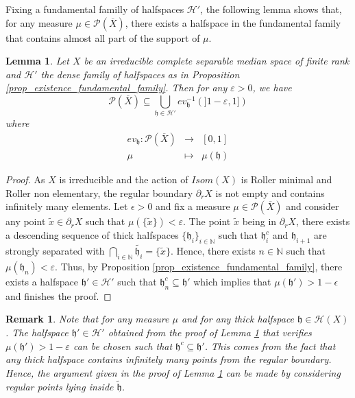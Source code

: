 \documentclass{amsart}
\numberwithin{equation}{section}
\newtheorem{lem}[thm]{Lemma}
\newtheorem{rmk}[thm]{Remark}
\newcommand{\HH}{\mathcal{H}}     %
\newcommand{\hh}{\mathfrak{h}}    %
\newcommand{\PP}{\mathcal{P}}     %
\newcommand{\NN}{\mathbb{N}}      %
\theoremstyle{definition}
\def\bar{\overline}
\begin{document}
Fixing a fundamental familly of halfspaces $\HH'$, the following lemma shows that, for any measure $\mu\in \PP(\bar X)$, there exists a halfspace in the fundamental family that contains almost all part of the support of $\mu$.
\begin{lem}\label{lem_measures_having_consistant_support_in_halfspace}
    Let $X$ be an irreducible complete separable median space of finite rank and $\HH'$ the dense family of halfspaces as in Proposition \ref{prop_existence_fundamental_family}. Then for any $\varepsilon>0$, we have 
    \[
    \PP(\bar{X})\subseteq \bigcup_{\hh\in\HH'}ev_\hh^{-1}(]1-\varepsilon,1])
    \]
    where 
    \begin{eqnarray*} 
    ev_\hh:\PP(\bar{X})&\rightarrow & [0,1] \\
           \mu &\mapsto& \mu(\hh)
       \end{eqnarray*}
\end{lem}
\begin{proof}
    As $X$ is irreducible and the action of $Isom(X)$ is Roller minimal and Roller non elementary, the regular boundary $\partial_r X$ is not empty and contains infinitely many elements. Let $\epsilon > 0$ and fix a measure $\mu\in\PP(\bar{X})$ and consider any point $\tilde{x}\in\partial_r X$ such that $\mu(\{\tilde{x}\})<\varepsilon$. The point $\tilde{x}$ being in $\partial_r X$, there exists a descending sequence of thick halfspaces $\{\hh_i\}_{i\in\NN}$ such that $\hh_i^c$ and $\hh_{i+1}$ are strongly separated with $\displaystyle{\bigcap_{i\in\NN}\tilde{\hh_i}}=\{\tilde{x}\}$. Hence, there exists $n\in\NN$ such that $\mu(\hh_n)<\varepsilon$. 
    Thus, by Proposition \ref{prop_existence_fundamental_family}, there exists a halfspace $\hh'\in \HH'$ such that $\hh_n^c\subseteq\hh'$ which implies that $\mu(\hh')>1-\epsilon$ and finishes the proof. 
\end{proof}

\begin{rmk}\label{rmk_measures_having_consistant_support_in_halfspace}
    Note that for any measure $\mu$ and for any thick halfspace $\hh\in\HH(X)$. The halfspace $\hh'\in\HH'$ obtained from the proof of Lemma \ref{lem_measures_having_consistant_support_in_halfspace} that verifies $\mu(\hh')>1-\varepsilon$ can be chosen such that $\hh^c\subseteq \hh'$. This comes from the fact that any thick halfspace contains infinitely many points from the regular boundary. Hence, the argument given in the proof of Lemma \ref{lem_measures_having_consistant_support_in_halfspace} can be made by considering regular points lying inside $\tilde{\hh}$.
\end{rmk}
\end{document}
